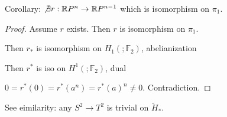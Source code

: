 \documentclass{article}
\theoremstyle{definition}
\begin{document}
    Corollary: \(\not\exists r: \mathbb{R} P^n \to \mathbb{R} P^{n-1}\) which is isomorphism on \(\pi_1\).

    \begin{proof}
        Assume \(r\) exists. Then \(r\) is isomorphism on \(\pi_1\).

        Then \(r_{\ast}\) is isomorphism on \(H_1(;\mathbb{F}_2)\), abelianization

        Then \(r^{\ast}\) is iso on \(H^1(;\mathbb{F}_2)\), dual

        \(0 = r^{\ast} (0) = r^{\ast}(a^n) = r^{\ast} (a)^n \neq 0\). Contradiction.

    \end{proof}

    See eimilarity: any \(S^2 \to T^2\) is trivial on \(\widetilde{H}_{\ast}\).
\end{document}
